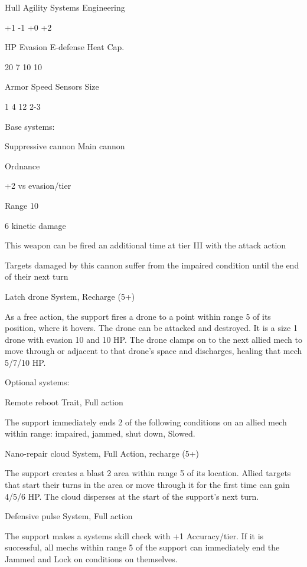  Hull       Agility      Systems       Engineering 

 +1         -1           +0            +2 

 HP         Evasion      E-defense     Heat Cap. 

 20         7            10            10 

 Armor      Speed        Sensors       Size 

 1          4            12            2-3 

Base systems:  

Suppressive cannon  
Main cannon
 
Ordnance
 
+2 vs evasion/tier
 
Range 10
 
6 kinetic damage
 
This weapon can be fired an additional time at tier III with the attack action
 
Targets damaged by this cannon suffer from the impaired condition until the end of their next  
turn
 

Latch drone  
System, Recharge (5+)
 
As a free action, the support fires a drone to a point within range 5 of its position, where it  
hovers. The drone can be attacked and destroyed. It is a size 1 drone with evasion 10 and 10 HP.  
The drone clamps on to the next allied mech to move through or adjacent to that drone’s space  
and discharges, healing that mech 5/7/10 HP.
 

Optional systems:
 
Remote reboot  
Trait, Full action
 

                                                                                                          


The support immediately ends 2 of the following conditions on an allied mech within range:  
impaired, jammed, shut down, Slowed. 
 

Nano-repair cloud  
System, Full Action, recharge (5+)
 
The support creates a blast 2 area within range 5 of its location. Allied targets that start their  
turns in the area or move through it for the first time can gain 4/5/6 HP. The cloud disperses at  
the start of the support’s next turn.
 

Defensive pulse  
System, Full action
 
The support makes a systems skill check with +1 Accuracy/tier. If it is successful, all mechs  
within range 5 of the support can immediately end the Jammed and Lock on conditions on  
themselves.
 

